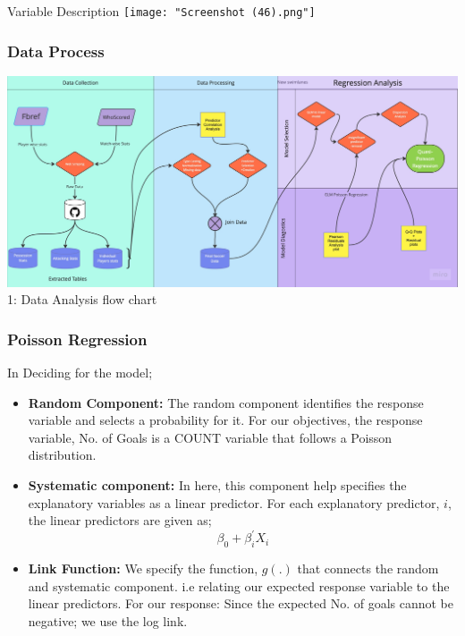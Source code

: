 \documentclass[11pt]{beamer}
\begin{document}
 \begin{frame}{Variable Description}
 \texttt{[image: "Screenshot (46).png"]}
     
 \end{frame}
 
 \begin{frame}
\frametitle{Data Process}
	\includegraphics[scale=0.12]{STAT625-3.jpg}\\
		\figurename 1: Data Analysis flow chart

\end{frame}
\begin{frame}

	\frametitle{Poisson Regression}

    In Deciding for the model;
    
   

    \begin{itemize}
     \setlength\itemsep{2em}
    \item \textbf{Random Component:} The random component identifies the response variable and selects a probability for it. For our objectives, the response variable, No. of Goals is a COUNT variable that follows a Poisson distribution. 
    \item \textbf{Systematic component:} In here, this component help specifies the explanatory variables as a linear predictor. For each explanatory predictor, $i$, the linear predictors are given as; \[\beta_0+\beta^{'}_{i}X_{i}\]

    \item \textbf{Link Function:} We specify the function, $g(.)$ that connects the random and systematic component. i.e relating our expected response variable to the linear predictors. For our response: Since the expected No. of goals cannot be negative; we use the log link. 

 \end{itemize}
\end{frame}
\end{document}
